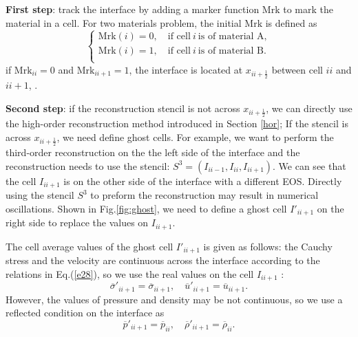 \documentclass[review]{elsarticle}
\begin{document}
\textbf{First step}: track the interface  by adding  a marker function $\text{Mrk}$  to mark the material in a cell. For two materials problem, the initial $\text{Mrk}$ is defined as
\begin{equation}
  \left\{
  \begin{aligned}
    \text{Mrk}(i) = 0 ,\quad \text{if cell} \ i \ \text{is of  material A}, \\
    \text{Mrk}(i) = 1 ,\quad \text{if cell} \ i \ \text{is  of material B}. \\
\end{aligned}
\right.
\end{equation}
if $\text{Mrk}_{ii} = 0$ and   $\text{Mrk}_{ii+1} = 1$, the interface is located at $x_{ii+\frac{1}{2}}$ between cell $ii$ and $ii+1$,  .

\textbf{Second  step}: if the reconstruction stencil is not across $x_{ii+\frac{1}{2}}$, we can directly use the high-order reconstruction method introduced in  Section \ref{hor}; If the stencil is across $x_{ii+\frac{1}{2}}$, we need define ghost cells. For example, we want to perform the third-order reconstruction on the the  left side of the interface and the reconstruction needs to use  the stencil: $S^3=(I_{ii-1},I_{ii}, I_{ii+1})$. We can see that  the cell $I_{ii+1}$ is  on the other side of the interface with a different EOS. Directly using the  stencil $S^3$ to preform the reconstruction may result in numerical oscillations.
Shown in Fig.\ref{fig:ghost}, we need to define   a  ghost cell $I'_{ii+1}$ on the right side to replace  the values on $I_{ii+1}$.


The cell average values of the ghost cell $I'_{ii+1}$ is  given as follows: the Cauchy stress and the velocity  are  continuous across the interface according to the relations in Eq.(\ref{e28}), so we use the real values on  the cell $I_{ii+1}$ :
\begin{equation}
  \overline{\sigma}'_{ii+1} = \overline{\sigma}_{ii+1}, \quad \overline{u}'_{ii+1} = \overline{u}_{ii+1}.
\end{equation}
However, the values of pressure and density may be not continuous, so we use a reflected condition on the interface as
\begin{equation}
\overline{p}'_{ii+1} = \overline{p}_{ii}, \quad \overline{\rho}'_{ii+1} = \overline{\rho}_{ii}.
\end{equation}
\end{document}
